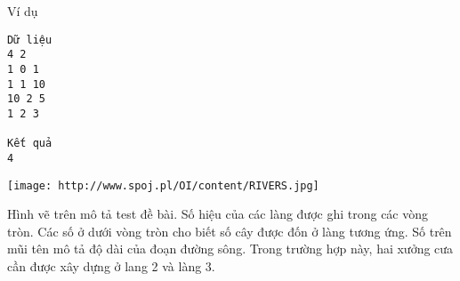Ví dụ  
\begin{verbatim}
Dữ liệu
4 2
1 0 1
1 1 10
10 2 5
1 2 3

Kết quả
4
\end{verbatim}
\texttt{[image: http://www.spoj.pl/OI/content/RIVERS.jpg]}

   Hình vẽ trên mô tả test đề bài. Số hiệu của các làng được ghi trong các vòng tròn. Các số ở dưới vòng tròn cho biết số cây được đốn ở làng tương ứng. Số trên mũi tên mô tả độ dài của đoạn đường sông. Trong trường hợp này, hai xưởng cưa cần được xây dựng ở lang 2 và làng 3.